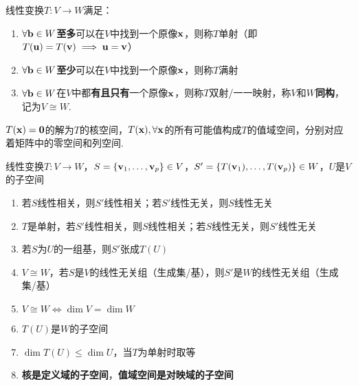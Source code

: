 \begin{definition}[单射与满射]
线性变换$T:V\to W$满足：
\begin{enumerate}
	\itemsep -3pt
	\item $\forall\mathbf{b}\in W$\textbf{至多}可以在$V$中找到一个原像$\mathbf{x}$，则称$T$单射（即$T(\mathbf{u})=T(\mathbf{v})\implies \mathbf{u}=\mathbf{v}$）
	\item $\forall\mathbf{b}\in W$\textbf{至少}可以在$V$中找到一个原像$\mathbf{x}$，则称$T$满射
	\item $\forall\mathbf{b}\in W$在$V$中都\textbf{有且只有}一个原像$\mathbf{x}$，则称$T$双射/一一映射，称$V$和$W$\textbf{同构}，记为$V\cong W$.
\end{enumerate}
\end{definition}
\begin{definition}[核空间与值域空间]
$T(\mathbf{x})=\mathbf{0}$的解为$T$的核空间，$T(\mathbf{x}),\forall\mathbf{x}$的所有可能值构成$T$的值域空间，分别对应着矩阵中的零空间和列空间.
\end{definition}
\begin{theorem}%
\label{lt_theo}
线性变换$T:V\to W$，$S=\{\mathbf{v}_1,\dots,\mathbf{v}_p\}\in V$，$S'=\{T(\mathbf{v}_1),\dots,T(\mathbf{v}_p)\}\in W$，$U$是$V$的子空间
\begin{enumerate}
	\itemsep -3pt
	\item \label{l1}若$S$线性相关，则$S'$线性相关；若$S'$线性无关，则$S$线性无关
	\item \label{l2}$T$是单射，若$S'$线性相关，则$S$线性相关；若$S$线性无关，则$S'$线性无关
	\item \label{l3}若$S$为$U$的一组基，则$S'$张成$T(U)$
	\item \label{l4}$V\cong W$，若$S$是$V$的线性无关组（生成集/基），则$S'$是$W$的线性无关组（生成集/基）
	\item $V\cong W\iff\dim V=\dim W$
	\item \label{subspace_range}$T(U)$是$W$的子空间
	\item $\dim T(U)\leq\dim U$，当$T$为单射时取等
	\item \textbf{核是定义域的子空间}，\textbf{值域空间是对映域的子空间}
\end{enumerate}
\end{theorem}

